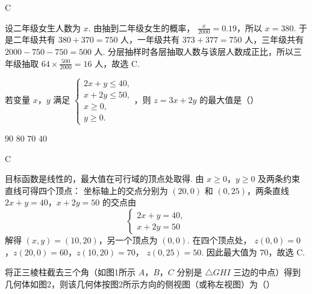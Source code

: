 \begin{answer}
C
\end{answer}

\begin{solution}
设二年级女生人数为 \(x\). 由抽到二年级女生的概率，
\(\frac{x}{2000}=0.19\)，所以 \(x=380\).
于是二年级共有 \(380+370=750\) 人，一年级共有
\(373+377=750\) 人，三年级共有
\(2000-750-750=500\) 人.
分层抽样时各层抽取人数与该层人数成正比，所以三年级抽取
\(64\times\frac{500}{2000}=16\) 人，故选 C.
\end{solution}

\begin{problem}
若变量 \(x\)，\(y\) 满足 \(\begin{cases}
2x + y \leqslant 40,\\
x + 2y \leqslant 50,\\
x \geqslant 0,\\
y \geqslant 0.
\end{cases}\)，则 \(z = 3x + 2y\) 的最大值是（\quad）

\choices
    {\(90\)}
    {\(80\)}
    {\(70\)}
    {\(40\)}
\end{problem}

\begin{answer}
C
\end{answer}

\begin{solution}
目标函数是线性的，最大值在可行域的顶点处取得.
由 \(x\geqslant0\)，\(y\geqslant0\) 及两条约束直线可得四个顶点：
坐标轴上的交点分别为 \((20,0)\) 和 \((0,25)\)，两条直线
\(2x+y=40\)，\(x+2y=50\) 的交点由
\[
\begin{cases}
2x+y=40,\\
x+2y=50
\end{cases}
\]
解得 \((x,y)=(10,20)\)，另一个顶点为 \((0,0)\).
在四个顶点处，
\(z(0,0)=0\)，\(z(20,0)=60\)，\(z(10,20)=70\)，
\(z(0,25)=50\).
因此最大值为 \(70\)，故选 C.
\end{solution}

\begin{problem}
将正三棱柱截去三个角（如图1所示 \(A\)，\(B\)，\(C\) 分别是 \(\triangle GHI\) 三边的中点）得到几何体如图2，则该几何体按图2所示方向的侧视图（或称左视图）为（\quad）


    {}
    {}
    {}
\end{problem}

